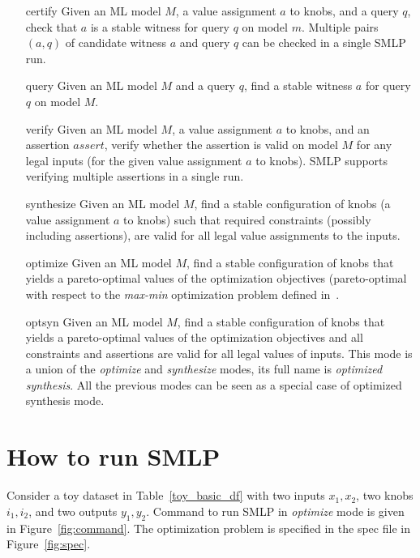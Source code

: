 \documentclass[a4paper,parskip=half]{article} %
\begin{document}
\begin{itemize}
\item[certify] Given an ML model $M$, a value assignment $a$ to knobs, and a query $q$, check that $a$ is a stable witness for query $q$ on model $m$. Multiple pairs $(a,q)$ of candidate witness $a$ and query $q$ can be checked in a single SMLP run.
\item[query] Given an ML model $M$  and a query $q$, find a stable witness $a$  for query $q$ on model $M$.
\item[verify] Given an ML model $M$,  a value assignment $a$ to knobs,  and an assertion $assert$, verify whether the assertion is valid on model $M$ for any legal inputs (for the given value assignment $a$ to knobs). SMLP supports verifying multiple assertions in a single run.
\item[synthesize] Given an ML model $M$,  find a stable configuration of knobs (a value assignment $a$ to knobs) such that required constraints (possibly including assertions),  are valid for all legal value assignments to the inputs.
\item[optimize]  Given an ML model $M$,  find a stable configuration of knobs that yields a pareto-optimal values of the optimization objectives (pareto-optimal with respect to the \emph{max-min} optimization problem defined in~\cite{BKK24}.
\item[optsyn] Given an ML model $M$,  find a stable configuration of knobs that yields a pareto-optimal values of the optimization objectives and all constraints and assertions are valid for all legal values of inputs. This mode is a union of the \emph{optimize} and \emph{synthesize} modes, its full name is \emph{optimized synthesis}. All the previous modes can be seen as a special case of optimized synthesis mode.
\end{itemize}


\section{How to run SMLP}\label{sec:mrc}


Consider a toy dataset in Table~\cref{toy_basic_df} with two inputs $x_1, x_2$, two knobs $i_1, i_2$, and two outputs $y_1, y_2$.
Command to run SMLP in \emph{optimize} mode is given in Figure~\cref{fig:command}.
The optimization problem is specified in the spec file in Figure~\cref{fig:spec}.
\end{document}
